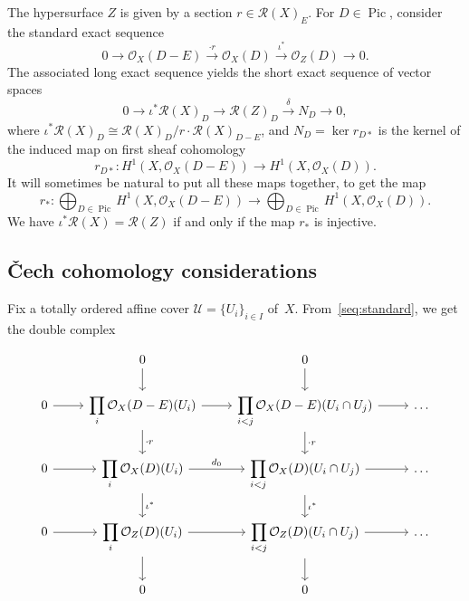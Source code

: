 \documentclass[a4paper,11pt]{amsart}
\theoremstyle{plain}
\theoremstyle{definition}
\newcommand{\R}{\mathcal{R}}
\newcommand{\Ox}{\mathcal{O}}
\DeclareMathOperator{\Pic}{Pic}
\newcommand{\pic}{\Pic}
\begin{document}
The hypersurface $Z$ is given by a section $r \in \R(X)_E$. For $D\in \pic$, consider the standard exact sequence
\begin{equation}\label{seq:standard}
0\longrightarrow \Ox_X(D-E)\stackrel{\cdot r}\longrightarrow \Ox_X(D) \stackrel{\iota^*}\longrightarrow \Ox_Z(D)\longrightarrow 0. \end{equation}
The associated long exact sequence yields the short exact sequence of vector spaces
\begin{equation}\label{seq:short}
0\longrightarrow \iota^*\R(X)_D\stackrel{}\longrightarrow \R(Z)_D \stackrel{\delta}\longrightarrow N_D\longrightarrow 0,
\end{equation}
where $\iota^*\R(X)_D\cong \R(X)_D / r \cdot \R(X)_{D-E}$, and $N_D=\ker r_{D*}$ is the kernel of the induced map on first sheaf cohomology
\begin{equation}\label{seq:r*}
r_{D*} : H^1(X, \Ox_X(D-E)) \longrightarrow H^1(X, \Ox_X(D)).
\end{equation}
It will sometimes be natural to put all these maps together, to get the map
\begin{equation}
r_{*} : \bigoplus_{D\in\Pic} H^1(X, \Ox_X(D-E)) \longrightarrow \bigoplus_{D\in\Pic} H^1(X, \Ox_X(D)).
\end{equation}
We have $\iota^*\R(X)= \R(Z)$ if and only if the map $r_*$ is injective. 

\subsection{\v Cech cohomology considerations}\label{subsec:cech}

Fix a totally ordered affine cover $\mathcal{U} = \{U_i\}_{i \in I}$ of~$X$. 
From~\eqref{seq:standard}, we get the double complex

\begin{equation}\label{complex}\begin{tikzcd}
{} & 0\arrow{d} & 0\arrow{d} \\
0\arrow{r} & \displaystyle\prod_{i}\Ox_X(D-E)(U_i) \arrow{r}\arrow{d}{\cdot r} &  \displaystyle\prod_{i<j}\Ox_X(D-E)(U_i \cap U_j)\arrow{r} \arrow{d}{\cdot r}& \ldots \\
0\arrow{r} & \displaystyle\prod_{i}\Ox_X(D)(U_i)\arrow{r}{d_0} \arrow{d}{\iota^*}& \displaystyle\prod_{i<j}\Ox_X(D)(U_i \cap U_j)\arrow{r} \arrow{d}{\iota^*} & \ldots \\
0\arrow{r} &\displaystyle\prod_{i}\Ox_Z(D)(U_i)\arrow{r} \arrow{d}& \displaystyle\prod_{i<j}\Ox_Z(D)(U_i \cap U_j)\arrow{r} \arrow{d} & \ldots \\
{} & 0 & 0 
\end{tikzcd}\end{equation}
\end{document}
